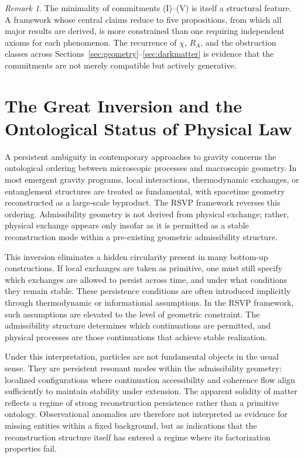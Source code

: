 \documentclass[11pt, a4paper]{article}
\theoremstyle{plain}
\theoremstyle{definition}
\theoremstyle{remark}
\newtheorem{remark}[theorem]{Remark}
\newcommand{\RA}{R_{\!A}}
\begin{document}
\begin{remark}
The minimality of commitments (I)--(V) is itself a structural feature. A framework
whose central claims reduce to five propositions, from which all major results are
derived, is more constrained than one requiring independent axioms for each
phenomenon. The recurrence of $\chi$, $\RA$, and the obstruction classes across
Sections~\ref{sec:geometry}--\ref{sec:darkmatter} is evidence that the commitments
are not merely compatible but actively generative.
\end{remark}

\section{The Great Inversion and the Ontological Status of Physical Law}
\label{sec:inversion}

A persistent ambiguity in contemporary approaches to gravity concerns the ontological
ordering between microscopic processes and macroscopic geometry. In most emergent
gravity programs, local interactions, thermodynamic exchanges, or entanglement
structures are treated as fundamental, with spacetime geometry reconstructed as a
large-scale byproduct. The RSVP framework reverses this ordering. Admissibility
geometry is not derived from physical exchange; rather, physical exchange appears only
insofar as it is permitted as a stable reconstruction mode within a pre-existing
geometric admissibility structure.

This inversion eliminates a hidden circularity present in many bottom-up
constructions. If local exchanges are taken as primitive, one must still specify which
exchanges are allowed to persist across time, and under what conditions they remain
stable. These persistence conditions are often introduced implicitly through
thermodynamic or informational assumptions. In the RSVP framework, such assumptions
are elevated to the level of geometric constraint. The admissibility structure
determines which continuations are permitted, and physical processes are those
continuations that achieve stable realization.

Under this interpretation, particles are not fundamental objects in the usual sense.
They are persistent resonant modes within the admissibility geometry: localized
configurations where continuation accessibility and coherence flow align sufficiently
to maintain stability under extension. The apparent solidity of matter reflects a
regime of strong reconstruction persistence rather than a primitive ontology.
Observational anomalies are therefore not interpreted as evidence for missing entities
within a fixed background, but as indications that the reconstruction structure itself
has entered a regime where its factorization properties fail.
\end{document}
